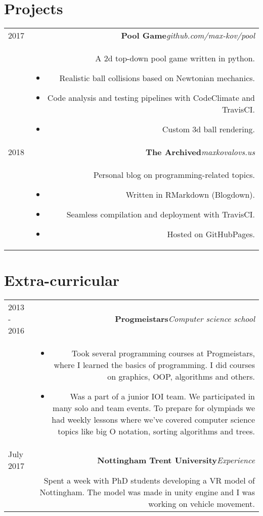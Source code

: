 \documentclass[]{article}
\begin{document}
\section*{Projects}
\begin{tabular}{L!{\color{lightgray}\vrule width 0.5pt}R}
2017&{\bf Pool Game}\hfill \textit{github.com/max-kov/pool}\\
&A 2d top-down pool game written in python.
\begin{itemize}
\item Realistic ball collisions based on Newtonian mechanics.
\item Code analysis and testing pipelines with CodeClimate and TravisCI.
\item Custom 3d ball rendering.
\end{itemize}\\
2018&{\bf The Archived}\hfill \textit{maxkovalovs.us}\\
&Personal blog on programming-related topics.
\begin{itemize}
\item Written in RMarkdown (Blogdown).
\item Seamless compilation and deployment with TravisCI.
\item Hosted on GitHubPages.
\end{itemize}
\end{tabular}

\section*{Extra-curricular}
\begin{tabular}{L!{\color{lightgray}\vrule width 0.5pt}R}
2013 - 2016&{\bf Progmeistars}\hfill \textit{Computer science school}\\
&\begin{itemize}
\item Took several programming courses at Progmeistars, where I learned the basics of programming. I did courses on graphics, OOP, algorithms and others.
\item Was a part of a junior IOI team. We participated in many solo and team events. To prepare for olympiads we had weekly lessons where we've covered computer science topics like big O notation, sorting algorithms and trees.
\end{itemize}\\
July 2017&{\bf Nottingham Trent University}\hfill \textit{Experience}\\
&Spent a week with PhD students developing a VR model of Nottingham. The model was made in unity engine and I was working on vehicle movement.
\end{tabular}
\end{document}

